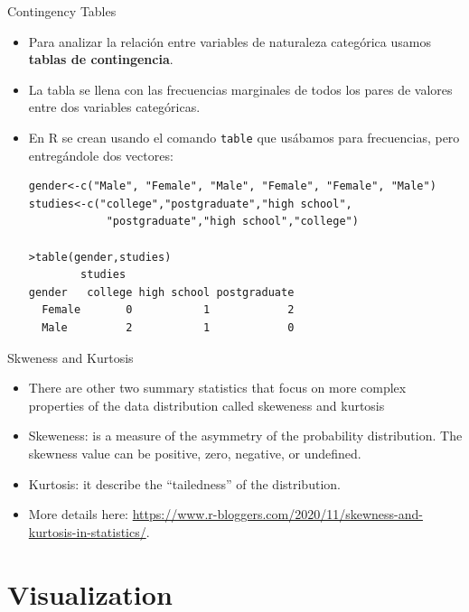 \documentclass[handout]{beamer}
\begin{document}
\begin{frame}[fragile]{Contingency Tables}
\scriptsize{
\begin{itemize}
 \item Para analizar la relación entre variables de naturaleza categórica usamos \textbf{tablas de contingencia}.
 \item La tabla se llena con las frecuencias marginales de todos los pares de valores entre dos variables categóricas.
 \item En R se crean usando el comando \verb+table+ que usábamos para frecuencias, pero entregándole dos vectores:
 \begin{verbatim}
gender<-c("Male", "Female", "Male", "Female", "Female", "Male")
studies<-c("college","postgraduate","high school",
            "postgraduate","high school","college")
            
>table(gender,studies)
        studies
gender   college high school postgraduate
  Female       0           1            2
  Male         2           1            0
 \end{verbatim}

 
 
\end{itemize}


} 
\end{frame}


\begin{frame}{Skweness and Kurtosis}
\scriptsize{
\begin{itemize}
\item There are other two summary statistics that focus on more complex properties of the data distribution called skeweness and kurtosis
\item Skeweness: is a measure of the asymmetry of the probability distribution. The skewness value can be positive, zero, negative, or undefined. 
\item Kurtosis: it  describe the ``tailedness'' of the distribution.

\item More details here: \url{https://www.r-bloggers.com/2020/11/skewness-and-kurtosis-in-statistics/}.

\end{itemize}
}
 
\end{frame}




\section{Visualization}
\end{document}
